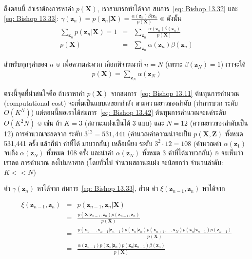 ถึงตอนนี้ ถ้าเราต้องการหาค่า $p(\textbf{X})$, เราสามารถทำได้จาก สมการ~\ref{eq: Bishop 13.32} และ \ref{eq: Bishop 13.33}: $
\gamma(\textbf{z}_n) = p(\textbf{z}_n|\textbf{X}) = \frac{\alpha(\textbf{z}_n) \beta(\textbf{z}_n}{p(\textbf{X})}$
๏ ดังนั้น
\begin{eqnarray}
\sum_{\textbf{z}_n} p(\textbf{z}_n|\textbf{X}) = 1 
&=& \sum_{\textbf{z}_n} \frac{\alpha(\textbf{z}_n) \beta(\textbf{z}_n)}{p(\textbf{X})}
\nonumber \\
p(\textbf{X})
&=& \sum_{\textbf{z}_n} \alpha(\textbf{z}_n) \beta(\textbf{z}_n)
\label{eq: Bishop 13.41}
\end{eqnarray}

สำหรับทุกๆค่าของ $n$
๏ เพื่อความสะดวก เลือกพิจารณาที่ $n=N$ (เพราะ $\beta(\textbf{z}_N)=1$) เราจะได้
\begin{eqnarray}
p(\textbf{X}) = \sum_{\textbf{z}_N} \alpha(\textbf{z}_N)
\label{eq: Bishop 13.42}
\end{eqnarray}

ตรงนี้จุดที่น่าสนใจคือ ถ้าเราหาค่า $p(\textbf{X})$ จากสมการ~\ref{eq: Bishop 13.11} ต้นทุนการคำนวณ (computational cost) จะเพิ่มเป็นแบบเลขยกกำลัง ตามความยาวของลำดับ (ทำการบวก ระดับ $O(K^N)$) แต่ตอนนี้พอเราได้สมการ~\ref{eq: Bishop 13.42} ต้นทุนการคำนวณจะแค่ระดับ $O(K^2 N)$
๏ เช่น ถ้า $K=3$ (สถานะแฝงเป็นได้ 3 แบบ) และ $N=12$ (ความยาวของลำดับเป็น 12) การคำนวณจะลดจาก ระดับ $3^{12} = 531,441$ (คำนวณค่าความน่าจะเป็น $p(\textbf{X}, \textbf{Z})$ ทั้งหมด 531,441 ครั้ง แล้วก็นำ ค่าที่ได้ มาบวกกัน) เหลือเพียง ระดับ $3^2 \cdot 12 = 108$ (คำนวณค่า $\alpha(\textbf{z}_1)$ จนถึง $\alpha(\textbf{z}_N)$ ทั้งหมด 108 ครั้ง  และนำค่า $\alpha(\textbf{z}_N)$ ทั้งหมด 3 ค่าที่ได้มาบวกกัน)
๏ จะเห็นว่า เราลด การคำนวณ ลงไปมหาศาล (โดยทั่วไป จำนวนสถานะแฝง จะน้อยกว่า จำนวนลำดับ: $K << N$)

ค่า $\gamma(\textbf{z}_n)$ หาได้จาก สมการ~\ref{eq: Bishop 13.33}, 
ส่วน ค่า $\xi (\textbf{z}_{n-1}, \textbf{z}_n)$ หาได้จาก

\begin{eqnarray}
\xi (\textbf{z}_{n-1}, \textbf{z}_n) 
&=& p(\textbf{z}_{n-1}, \textbf{z}_n | \textbf{X})
\nonumber \\
&=& \frac{p(\textbf{X}|\textbf{z}_{n-1}, \textbf{z}_n) p(\textbf{z}_{n-1}, \textbf{z}_n)}{p(\textbf{X})}
\nonumber \\
&=& \frac{ p(\textbf{x}_1, \ldots, \textbf{x}_{n-1}|\textbf{z}_{n-1}) p(\textbf{x}_n|\textbf{z}_n) p(\textbf{x}_{n+1}, \ldots, \textbf{x}_N) p(\textbf{z}_n|\textbf{z}_{n-1}) p(\textbf{z}_{n-1}) }{p(\textbf{X})}
\nonumber \\
&=& \frac{\alpha(\textbf{z}_{n-1}) p(\textbf{x}_n|\textbf{z}_n) p(\textbf{z}_n| \textbf{z}_{n-1}) \beta(\textbf{z}_n)}{p(\textbf{X})}
\label{eq: Bishop 13.43}
\end{eqnarray}

